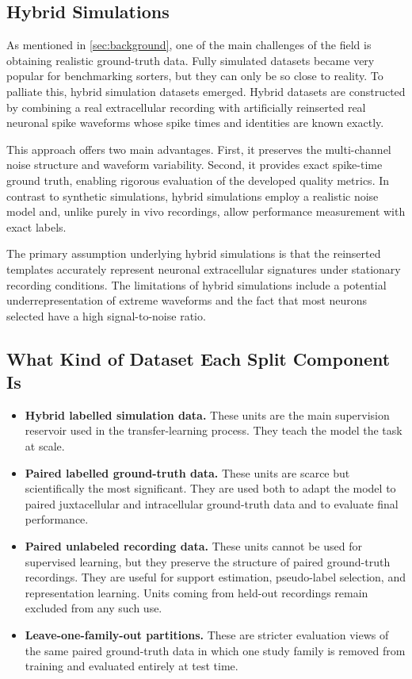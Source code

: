 \subsection{Hybrid Simulations}

As mentioned in \cref{sec:background}, one of the main challenges of the field is obtaining realistic ground-truth data. Fully simulated datasets became very popular for benchmarking sorters, but they can only be so close to reality. To palliate this, hybrid simulation datasets emerged. Hybrid datasets are constructed by combining a real extracellular recording with artificially reinserted real neuronal spike waveforms whose spike times and identities are known exactly.

This approach offers two main advantages. First, it preserves the multi-channel noise structure and waveform variability. Second, it provides exact spike-time ground truth, enabling rigorous evaluation of the developed quality metrics. In contrast to synthetic simulations, hybrid simulations employ a realistic noise model and, unlike purely in vivo recordings, allow performance measurement with exact labels.

The primary assumption underlying hybrid simulations is that the reinserted templates accurately represent neuronal extracellular signatures under stationary recording conditions. The limitations of hybrid simulations include a potential underrepresentation of extreme waveforms and the fact that most neurons selected have a high signal-to-noise ratio.

\subsection{What Kind of Dataset Each Split Component Is}

\begin{itemize}
    \item \textbf{Hybrid labelled simulation data.} These units are the main supervision reservoir used in the transfer-learning process. They teach the model the task at scale.
    \item \textbf{Paired labelled ground-truth data.} These units are scarce but scientifically the most significant. They are used both to adapt the model to paired juxtacellular and intracellular ground-truth data and to evaluate final performance.
    \item \textbf{Paired unlabeled recording data.} These units cannot be used for supervised learning, but they preserve the structure of paired ground-truth recordings. They are useful for support estimation, pseudo-label selection, and representation learning. Units coming from held-out recordings remain excluded from any such use.
    \item \textbf{Leave-one-family-out partitions.} These are stricter evaluation views of the same paired ground-truth data in which one study family is removed from training and evaluated entirely at test time.
\end{itemize}

